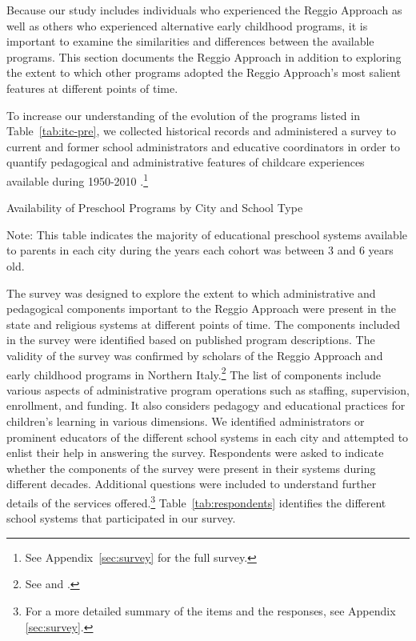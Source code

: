Because our study includes individuals who experienced the Reggio Approach as well as others who experienced alternative early childhood programs, it is important to examine the similarities and differences between the available programs. This section documents the Reggio Approach in addition to exploring the extent to which other programs adopted the Reggio Approach's most salient features at different points of time.

To increase our understanding of the evolution of the programs listed in Table~\ref{tab:itc-pre}, we collected historical records \citep{Padova-Admin-Data_1964-2011,Reggio-Admin-data_1966-2006,Reggio-Annual-Journals_1994-2011} and administered a survey to current and former school administrators and educative coordinators in order to quantify pedagogical and administrative features of childcare experiences available during 1950-2010 \citep{CEHD_2016_Historical-Analysis}.\footnote{See Appendix~\ref{sec:survey} for the full survey.} 
~\\
\begin{table}[H]
\centering
\caption{Availability of Preschool Programs by City and School Type}\label{tab:itc-pre}
\begin{adjustbox}{width=\textwidth}
\begin{threeparttable}
	
\begin{tablenotes}
Note: This table indicates the majority of educational preschool systems available to parents in each city during the years each cohort was between 3 and 6 years old. 
\end{tablenotes}
\end{threeparttable}
\end{adjustbox}
\end{table}

The survey was designed to explore the extent to which administrative and pedagogical components important to the Reggio Approach were present in the state and religious systems at different points of time. The components included in the survey were identified based on published program descriptions. The validity of the survey was confirmed by scholars of the Reggio Approach and early childhood programs in Northern Italy.\footnote{See \citet{Edwards-etal-eds_1998_Hundred-Languages} and \citet{Corsaro_2008_Policy-Practice}.} The list of components include various aspects of administrative program operations such as staffing, supervision, enrollment, and funding. It also considers pedagogy and educational practices for children's learning in various dimensions. We identified administrators or prominent educators of the different school systems in each city and attempted to enlist their help in answering the survey. Respondents were asked to indicate whether the components of the survey were present in their systems during different decades. Additional questions were included to understand further details of the services offered.\footnote{For a more detailed summary of the items and the responses, see Appendix \ref{sec:survey}.} Table~\ref{tab:respondents} identifies the different school systems that participated in our survey.

